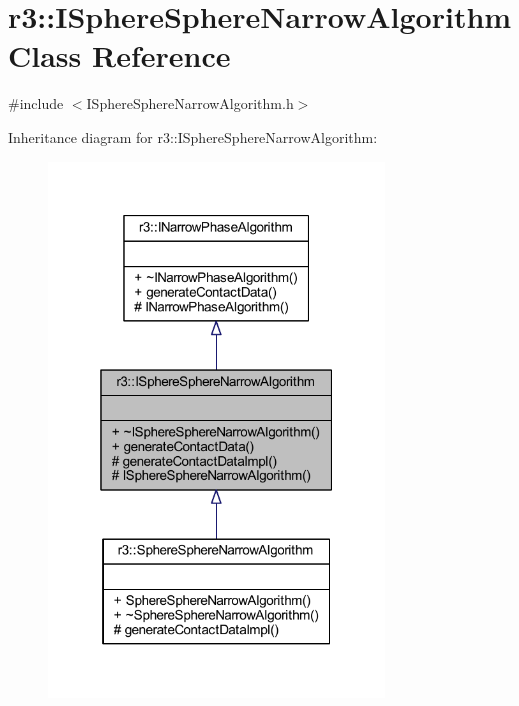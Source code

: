\hypertarget{classr3_1_1_i_sphere_sphere_narrow_algorithm}{}\section{r3\+:\+:I\+Sphere\+Sphere\+Narrow\+Algorithm Class Reference}
\label{classr3_1_1_i_sphere_sphere_narrow_algorithm}


{\ttfamily \#include $<$I\+Sphere\+Sphere\+Narrow\+Algorithm.\+h$>$}



Inheritance diagram for r3\+:\+:I\+Sphere\+Sphere\+Narrow\+Algorithm\+:\nopagebreak
\begin{figure}[H]
\begin{center}
\leavevmode
\includegraphics[width=253pt]{classr3_1_1_i_sphere_sphere_narrow_algorithm__inherit__graph}
\end{center}
\end{figure}


